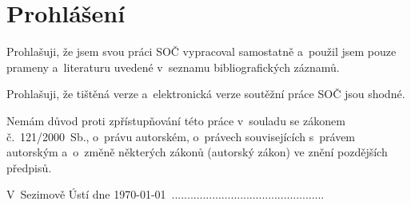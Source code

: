 ﻿
\vfill

\section*{Prohlášení}

Prohlašuji, že jsem svou práci SOČ vypracoval samostatně a~použil jsem pouze prameny a~literaturu uvedené v~seznamu bibliografických záznamů.

Prohlašuji, že tištěná verze a~elektronická verze soutěžní práce SOČ jsou shodné.

Nemám důvod proti zpřístupňování této práce v~souladu se zákonem č.~121/2000~Sb., o~právu autorském, o~právech souvisejících s~právem autorským a~o~změně některých zákonů (autorský zákon) ve znění pozdějších předpisů.


\vglue 2cm

\noindent V~Sezimově Ústí dne \today \ .................................................

\vglue 1cm
